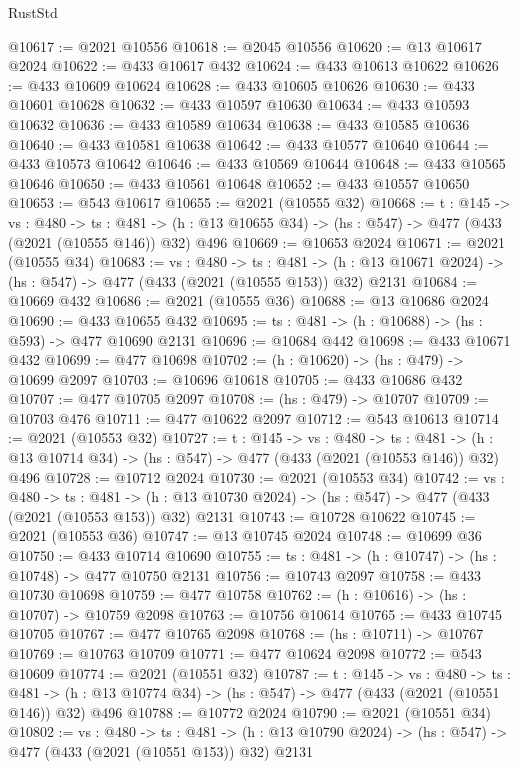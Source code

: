 \begin{lexlean}{RustStd}
\begin{coremodule}
{\begin{coremodule}
{{{{{{{{{{{{{{{{@10617 := @2021 @10556
@10618 := @2045 @10556
@10620 := @13 @10617 @2024
@10622 := @433 @10617 @432
@10624 := @433 @10613 @10622
@10626 := @433 @10609 @10624
@10628 := @433 @10605 @10626
@10630 := @433 @10601 @10628
@10632 := @433 @10597 @10630
@10634 := @433 @10593 @10632
@10636 := @433 @10589 @10634
@10638 := @433 @10585 @10636
@10640 := @433 @10581 @10638
@10642 := @433 @10577 @10640
@10644 := @433 @10573 @10642
@10646 := @433 @10569 @10644
@10648 := @433 @10565 @10646
@10650 := @433 @10561 @10648
@10652 := @433 @10557 @10650
@10653 := @543 @10617
@10655 := @2021 (@10555 @32)
@10668 := {t : @145} ->
  {vs : @480} ->
  {ts : @481} -> (h : @13 @10655 @34) -> (hs : @547) -> @477 (@433 (@2021 (@10555 @146)) @32) @496
@10669 := @10653 @2024
@10671 := @2021 (@10555 @34)
@10683 := {vs : @480} ->
  {ts : @481} ->
  (h : @13 @10671 @2024) -> (hs : @547) -> @477 (@433 (@2021 (@10555 @153)) @32) @2131
@10684 := @10669 @432
@10686 := @2021 (@10555 @36)
@10688 := @13 @10686 @2024
@10690 := @433 @10655 @432
@10695 := {ts : @481} -> (h : @10688) -> (hs : @593) -> @477 @10690 @2131
@10696 := @10684 @442
@10698 := @433 @10671 @432
@10699 := @477 @10698
@10702 := (h : @10620) -> (hs : @479) -> @10699 @2097
@10703 := @10696 @10618
@10705 := @433 @10686 @432
@10707 := @477 @10705 @2097
@10708 := (hs : @479) -> @10707
@10709 := @10703 @476
@10711 := @477 @10622 @2097
@10712 := @543 @10613
@10714 := @2021 (@10553 @32)
@10727 := {t : @145} ->
  {vs : @480} ->
  {ts : @481} -> (h : @13 @10714 @34) -> (hs : @547) -> @477 (@433 (@2021 (@10553 @146)) @32) @496
@10728 := @10712 @2024
@10730 := @2021 (@10553 @34)
@10742 := {vs : @480} ->
  {ts : @481} ->
  (h : @13 @10730 @2024) -> (hs : @547) -> @477 (@433 (@2021 (@10553 @153)) @32) @2131
@10743 := @10728 @10622
@10745 := @2021 (@10553 @36)
@10747 := @13 @10745 @2024
@10748 := @10699 @36
@10750 := @433 @10714 @10690
@10755 := {ts : @481} -> (h : @10747) -> (hs : @10748) -> @477 @10750 @2131
@10756 := @10743 @2097
@10758 := @433 @10730 @10698
@10759 := @477 @10758
@10762 := (h : @10616) -> (hs : @10707) -> @10759 @2098
@10763 := @10756 @10614
@10765 := @433 @10745 @10705
@10767 := @477 @10765 @2098
@10768 := (hs : @10711) -> @10767
@10769 := @10763 @10709
@10771 := @477 @10624 @2098
@10772 := @543 @10609
@10774 := @2021 (@10551 @32)
@10787 := {t : @145} ->
  {vs : @480} ->
  {ts : @481} -> (h : @13 @10774 @34) -> (hs : @547) -> @477 (@433 (@2021 (@10551 @146)) @32) @496
@10788 := @10772 @2024
@10790 := @2021 (@10551 @34)
@10802 := {vs : @480} ->
  {ts : @481} ->
  (h : @13 @10790 @2024) -> (hs : @547) -> @477 (@433 (@2021 (@10551 @153)) @32) @2131
}}}}}}}}}}}}}}}}
\end{coremodule}}
\end{coremodule}
\end{lexlean}
